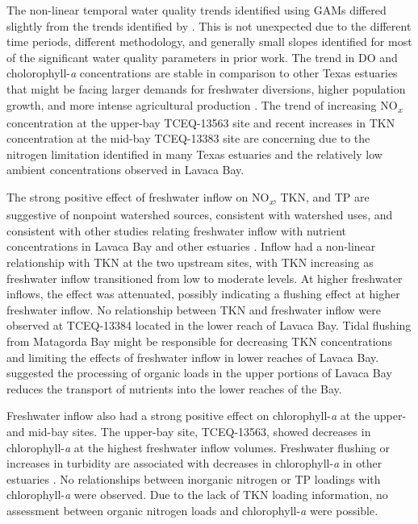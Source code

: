 \documentclass[water,article,submit,oneauthor]{Definitions/mdpi}
\begin{document}
The non-linear temporal water quality trends identified using GAMs
differed slightly from the trends identified by
\citet{bugica_water_2020}. This is not unexpected due to the different
time periods, different methodology, and generally small slopes
identified for most of the significant water quality parameters in prior
work. The trend in DO and cholorophyll-\emph{a} concentrations are
stable in comparison to other Texas estuaries that might be facing
larger demands for freshwater diversions, higher population growth, and
more intense agricultural production
\citep{wetzWaterQualityDynamics2016, bugica_water_2020}. The trend of
increasing NO\textsubscript{\emph{x}} concentration at the upper-bay
TCEQ-13563 site and recent increases in TKN concentration at the mid-bay
TCEQ-13383 site are concerning due to the nitrogen limitation identified
in many Texas estuaries
\citep{gardnerNitrogenFixationDissimilatory2006, houTransformationFateNitrate2012, doradoUnderstandingInteractionsFreshwater2015, paudelRelationshipSuspendedSolids2019, wetz_exceptionally_2017}
and the relatively low ambient concentrations observed in Lavaca Bay.

The strong positive effect of freshwater inflow on
NO\textsubscript{\emph{x}}, TKN, and TP are suggestive of nonpoint
watershed sources, consistent with watershed uses, and consistent with
other studies relating freshwater inflow with nutrient concentrations in
Lavaca Bay and other estuaries
\citep{russell_effect_2006, caffreyHighNutrientPulses2007, peierlsNonmonotonicResponsesPhytoplankton2012, palmerImpactsDroughtsLow2015, ciraPhytoplanktonDynamicsLowInflow2021}.
Inflow had a non-linear relationship with TKN at the two upstream sites,
with TKN increasing as freshwater inflow transitioned from low to
moderate levels. At higher freshwater inflows, the effect was
attenuated, possibly indicating a flushing effect at higher freshwater
inflow. No relationship between TKN and freshwater inflow were observed
at TCEQ-13384 located in the lower reach of Lavaca Bay. Tidal flushing
from Matagorda Bay might be responsible for decreasing TKN
concentrations and limiting the effects of freshwater inflow in lower
reaches of Lavaca Bay. \citet{russell_effect_2006} suggested the
processing of organic loads in the upper portions of Lavaca Bay reduces
the transport of nutrients into the lower reaches of the Bay.

Freshwater inflow also had a strong positive effect on
chlorophyll-\emph{a} at the upper- and mid-bay sites. The upper-bay
site, TCEQ-13563, showed decreases in chlorophyll-\emph{a} at the
highest freshwater inflow volumes. Freshwater flushing or increases in
turbidity are associated with decreases in chlorophyll-\emph{a} in other
estuaries
\citep{peierlsNonmonotonicResponsesPhytoplankton2012, cloernPhytoplanktonPrimaryProduction2014}.
No relationships between inorganic nitrogen or TP loadings with
chlorophyll-\emph{a} were observed. Due to the lack of TKN loading
information, no assessment between organic nitrogen loads and
chlorophyll-\emph{a} were possible.
\end{document}
